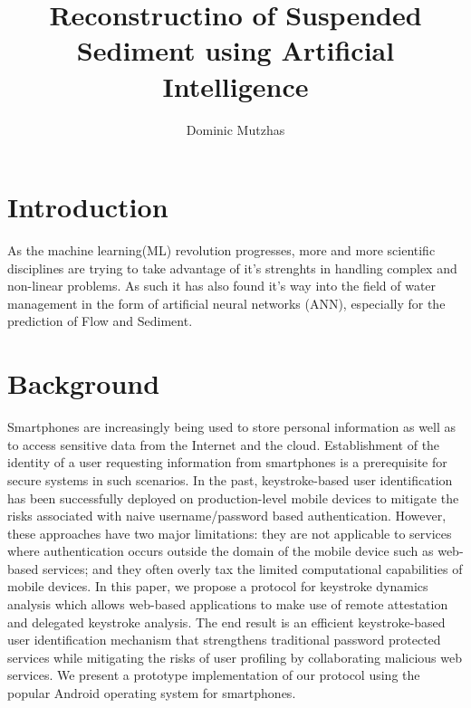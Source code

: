 \documentclass[twocolumn]{article}
\begin{document}
\title{Reconstructino of Suspended Sediment using Artificial Intelligence}
\author{Dominic Mutzhas}
\maketitle

\begin{abstract} 

\end{abstract} 


\section{Introduction}
As the machine learning(ML) revolution progresses, more and more scientific disciplines are trying to take advantage of it's strenghts in handling complex and non-linear problems. As such it has also found it's way into the field of water management in the form of artificial neural networks (ANN), especially for the prediction of Flow and Sediment.

\section{Background} 
Smartphones are increasingly being used to store personal information as well as to access sensitive data from the Internet and the cloud. Establishment of the identity of a user requesting information from smartphones is a prerequisite for  secure systems in such scenarios. In the past, keystroke-based user identification has been successfully deployed on production-level mobile devices to mitigate the risks associated with naive username/password based authentication. However, these approaches have two major limitations: they are not applicable to services where authentication occurs outside the domain of the mobile
device such as web-based services; and they often overly tax the limited computational capabilities of mobile devices. In this paper, we propose a protocol for keystroke dynamics analysis which allows web-based applications to make use of remote attestation and\cite{nauman2011using} delegated keystroke analysis. The end result is an efficient keystroke-based user identification mechanism that strengthens traditional password protected services
while mitigating the risks of user profiling by \cite{se-cs-collab:nauman10}collaborating malicious web
services. We present a prototype implementation of our protocol using
the popular Android operating system for smartphones.\cite{seo2011user}
\end{document}
